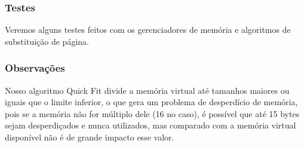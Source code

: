 \documentclass{beamer}
\begin{document}
\begin{frame}
  \frametitle{Testes}
  Veremos alguns testes feitos com os gerenciadores de memória e algoritmos de substituição de página.
\end{frame}


\begin{frame}
  \frametitle{Observações}
  Nosso algoritmo Quick Fit divide a memória virtual até tamanhos maiores ou iguais que o limite inferior, o que gera um problema de desperdício de memória, pois se a memória não for múltiplo dele (16 no caso),
  é possível que até 15 bytes sejam desperdiçados e nunca utilizados, mas comparado com a memória virtual disponível não é de grande impacto esse valor.
\end{frame}
\end{document}
